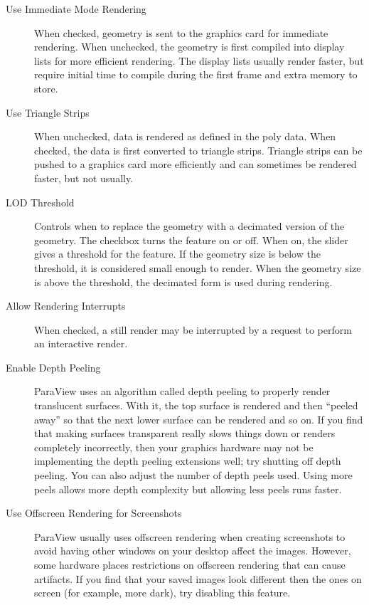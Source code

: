 \begin{description}
\item[Use Immediate Mode Rendering]  When
  checked, geometry is sent to the graphics card for immediate rendering.
  When unchecked, the geometry is first compiled into display lists for
  more efficient rendering.  The display lists usually render faster, but
  require initial time to compile during the first frame and extra memory
  to store.
\item[Use Triangle Strips]  When unchecked, data is
  rendered as defined in the poly data.  When checked, the data is first
  converted to triangle strips.  Triangle strips can be pushed to a
  graphics card more efficiently and can sometimes be rendered faster, but
  not usually.
\item[LOD Threshold] Controls when to replace the
  geometry with a decimated version of the geometry.  The checkbox turns
  the feature on or off.  When on, the slider gives a threshold for the
  feature.  If the geometry size is below the threshold, it is considered
  small enough to render.  When the geometry size is above the threshold,
  the decimated form is used during rendering.
\item[Allow Rendering Interrupts]  When
  checked, a still render may be interrupted by a request to perform an
  interactive render.
\item[Enable Depth Peeling]  ParaView uses an
  algorithm called depth peeling to properly render translucent surfaces.
  With it, the top surface is rendered and then ``peeled away'' so that the
  next lower surface can be rendered and so on.  If you find that making
  surfaces transparent really slows things down or renders completely
  incorrectly, then your graphics hardware may not be implementing the
  depth peeling extensions well; try shutting off depth peeling.  You can
  also adjust the number of depth peels used.  Using more peels allows more
  depth complexity but allowing less peels runs faster.
\item[Use Offscreen Rendering for Screenshots] 
  ParaView usually uses offscreen rendering when creating screenshots to
  avoid having other windows on your desktop affect the images.  However,
  some hardware places restrictions on offscreen rendering that can cause
  artifacts.  If you find that your saved images look different then the
  ones on screen (for example, more dark), try disabling this feature.
\end{description}

